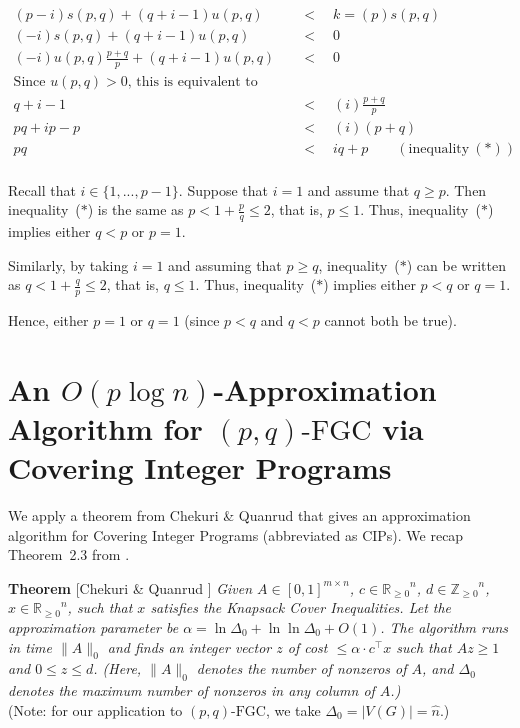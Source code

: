 \documentclass[11pt]{article}
\newcommand{\R}{\ensuremath{\mathbb R}}
\newcommand{\Rp}{\ensuremath{\R_{\geq 0}}}
\newcommand{\Zint}{\ensuremath{\mathbb Z}}
\newcommand{\Zp}{\ensuremath{\Zint_{\geq 0}}}
\newcommand{\fgc}{\mathrm{FGC}}
\newcommand{\pqfgc}{(p,q)\text{-}\fgc}
\begin{document}
\begin{appendices}
{\begin{align*}
(p-i) s(p,q) + (q+i-1) u(p,q) &\quad <\quad k = (p) s(p,q) \\
(-i) s(p,q) + (q+i-1) u(p,q) &\quad <\quad 0 \\
(-i)  u(p,q) \frac{p+q}{p} + (q+i-1) u(p,q) &\quad <\quad 0 \\
\text{Since $u(p,q)>0$, this is equivalent to} & \\
q+i-1 &\quad <\quad (i)  \frac{p+q}{p} \\
pq+ip-p &\quad <\quad (i) (p+q) \\
pq &\quad <\quad iq + p \qquad (\text{inequality}~(*)) \\
\end{align*}


Recall that $i \in \{1,...,p-1\}$.
Suppose that $i=1$ and assume that $q\geq p$.
Then inequality~($*$) is the same as
$\displaystyle p < 1 + \frac{p}{q} \leq 2$, that is, $p \leq 1$.
Thus, inequality~($*$) implies either $q < p$ or $p = 1$.

Similarly, by taking $i=1$ and assuming that $p\geq q$, inequality~($*$) can be written as
$\displaystyle q < 1 + \frac{q}{p} \leq 2$, that is, $q \leq 1$.
Thus, inequality~($*$) implies either $p < q$ or $q = 1$.

Hence, either $p=1$ or $q=1$ (since $p < q$ and $q < p$ cannot both be true).
}
\section{An $O(p\log{n})$-Approximation Algorithm for $\pqfgc$ via Covering Integer Programs \label{sec:A2:log-approx}}
{
We apply a theorem from Chekuri \& Quanrud \cite{CQ:soda19} that gives
an approximation algorithm for Covering Integer Programs (abbreviated as CIPs).
We recap Theorem~2.3 from \cite{CQ:soda19}.

\medskip

\noindent
\textbf{Theorem} [Chekuri \& Quanrud \cite{CQ:soda19}]
\textit{Given $A\in[0,1]^{m\times{n}}$, $c\in\Rp^n$, $d\in\Zp^n$, $x\in\Rp^n$,
such that $x$ satisfies the Knapsack Cover Inequalities.
Let the approximation parameter be $\alpha = \ln\Delta_0+\ln\ln\Delta_0+O(1)$.
The algorithm runs in time $\|A\|_0$ and finds an integer vector $z$
of cost $\leq \alpha \cdot c^\top x$ such that $Az\geq 1$ and $0\leq z\leq d$.
(Here, $\|A\|_0$ denotes the number of nonzeros of $A$, and $\Delta_0$
denotes the maximum number of nonzeros in any column of $A$.)
}
\\
(Note: for our application to $\pqfgc$, we take $\Delta_0 = |V(G)| = \hat{n}$.)

}
\end{appendices}
\end{document}
